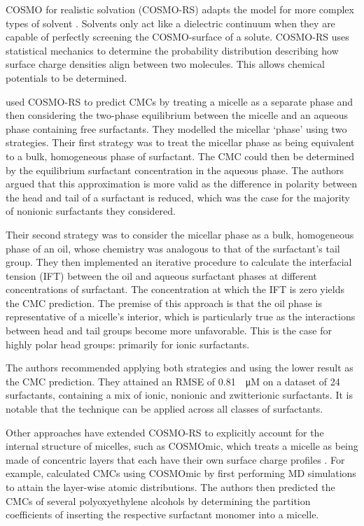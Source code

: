 COSMO for realistic solvation (COSMO-RS) adapts the model for more complex types
of solvent \cite{klamtCOSMORSAlternativeSimulation2010}. Solvents only act like
a dielectric continuum when they are capable of perfectly screening the
COSMO-surface of a solute. COSMO-RS uses statistical mechanics to determine the
probability distribution describing how surface charge densities align between
two molecules. This allows chemical potentials to be determined.

\citet{turchiFirstprinciplesPredictionCritical2022} used COSMO-RS to predict
CMCs by treating a micelle as a separate phase and then considering the
two-phase equilibrium between the micelle and an aqueous phase containing free
surfactants. They modelled the micellar `phase' using two strategies. Their
first strategy was to treat the micellar phase as being equivalent to a bulk,
homogeneous phase of surfactant. The CMC could then be determined by the
equilibrium surfactant concentration in the aqueous phase. The authors argued
that this approximation is more valid as the difference in polarity between the
head and tail of a surfactant is reduced, which was the case for the majority of
nonionic surfactants they considered.

Their second strategy was to consider the micellar phase as a bulk, homogeneous
phase of an oil, whose chemistry was analogous to that of the surfactant's tail
group. They then implemented an iterative procedure to calculate the interfacial
tension (IFT) between the oil and aqueous surfactant phases at different
concentrations of surfactant. The concentration at which the IFT is zero yields
the CMC prediction. The premise of this approach is that the oil phase is
representative of a micelle's interior, which is particularly true as the
interactions between head and tail groups become more unfavorable. This is the
case for highly polar head groups: primarily for ionic surfactants.

The authors recommended applying both strategies and using the lower result as
the CMC prediction. They attained an RMSE of \SI{0.81}{\log \micro M} on a
dataset of 24 surfactants, containing a mix of ionic, nonionic and zwitterionic
surfactants. It is notable that the technique can be applied across all classes
of surfactants.

Other approaches have extended COSMO-RS to explicitly account for the internal
structure of micelles, such as COSMOmic, which treats a micelle as being made of
concentric layers that each have their own surface charge profiles
\cite{klamtCOSMOmicMechanisticApproach2008}. For example,
\citet{jakobtorweihenPredictingCriticalMicelle2017} calculated CMCs using
COSMOmic by first performing MD simulations to attain the layer-wise atomic
distributions. The authors then predicted the CMCs of several polyoxyethylene
alcohols by determining the partition coefficients of inserting the respective
surfactant monomer into a micelle.

